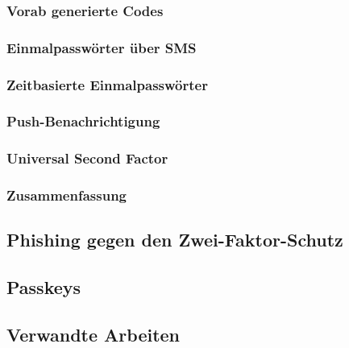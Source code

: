 \documentclass[doktyp=marbeit, twoside]{TUBAFarbeiten}
\begin{document}
        \subsubsection{Vorab generierte Codes}
        \label{sec: codes}
        

        \subsubsection{Einmalpasswörter über SMS}
        \label{sec: sms}
        

        \subsubsection{Zeitbasierte Einmalpasswörter}
        \label{sec: totp}
        

        \subsubsection{Push-Benachrichtigung}
        \label{sec: push}
        

        \subsubsection{Universal Second Factor}
        \label{sec: u2f}
        

        \subsubsection{Zusammenfassung}
        \label{sec: zusammenfassung verfahren}
        

    \subsection{Phishing gegen den Zwei-Faktor-Schutz}
        \label{sec: phishing}
        

    \subsection{Passkeys}
        \label{sec: passkeys}
        

    \subsection{Verwandte Arbeiten}
        \label{sec: verwandte arbeiten}
        
\end{document}
